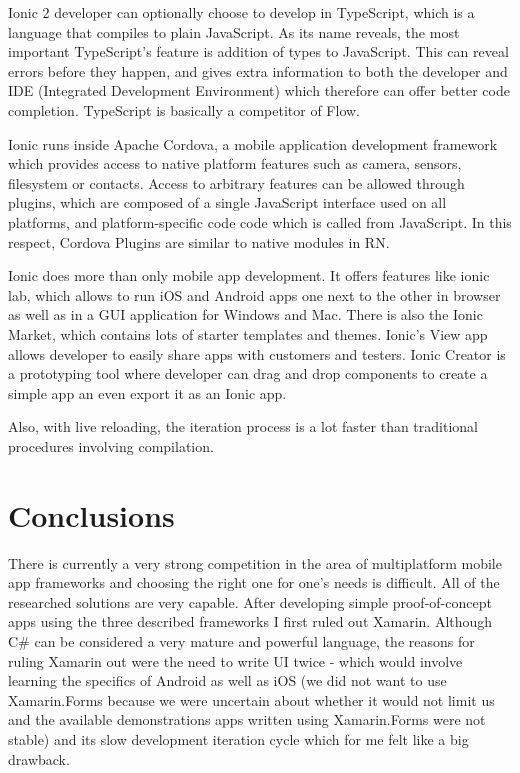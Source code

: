 Ionic 2 developer can optionally choose to develop in TypeScript, which is a language that compiles to plain JavaScript. As its name reveals, the most important TypeScript's feature is addition of types to JavaScript. This can reveal errors before they happen, and gives extra information to both the developer and IDE (Integrated Development Environment) which therefore can offer better code completion. TypeScript is basically a competitor of Flow.

Ionic runs inside Apache Cordova, a mobile application development framework which provides access to native platform features such as camera, sensors, filesystem or contacts. Access to arbitrary features can be allowed through plugins, which are composed of a single JavaScript interface used on all platforms, and platform-specific code code which is called from JavaScript. In this respect, Cordova Plugins are similar to native modules in RN.

Ionic does more than only mobile app development. It offers features like ionic lab, which allows to run iOS and Android apps one next to the other in browser as well as in a GUI application for Windows and Mac. There is also the Ionic Market, which contains lots of starter templates and themes. Ionic's View app allows developer to easily share apps with customers and testers. Ionic Creator is a prototyping tool where developer can drag and drop components to create a simple app an even export it as an Ionic app.

Also, with live reloading, the iteration process is a lot faster than traditional procedures involving compilation.


\section{Conclusions}

There is currently a very strong competition in the area of multiplatform mobile app frameworks and choosing the right one for one's needs is difficult. All of the researched solutions are very capable. 
After developing simple proof-of-concept apps using the three described frameworks I first ruled out Xamarin. Although C\# can be considered a very mature and powerful language, the reasons for ruling Xamarin out were the need to write UI twice - which would involve learning the specifics of Android as well as iOS (we did not want to use Xamarin.Forms because we were uncertain about whether it would not limit us and the available demonstrations apps written using Xamarin.Forms were not stable) and its slow development iteration cycle which for me felt like a big drawback.

